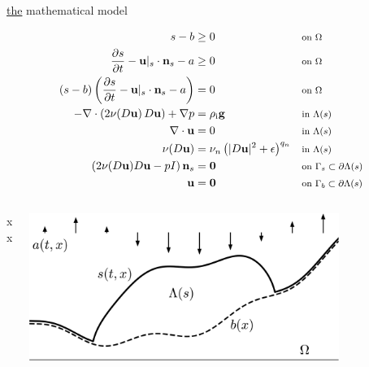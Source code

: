 \documentclass[10pt,dvipsnames]{beamer}
\newcommand{\bg}{\mathbf{g}}
\newcommand{\bn}{\mathbf{n}}
\newcommand{\bu}{\mathbf{u}}
\newcommand{\bzero}{\bm{0}}
\newcommand{\eps}{\epsilon}
\newcommand{\rhoi}{\rho_{\text{i}}}
\begin{document}
\newcommand{\where}[1]{\text{\footnotesize #1}}

\begin{frame}{\underline{the} mathematical model}

\begin{align*}
s - b &\ge 0 & &\where{on $\Omega$} \\
\frac{\partial s}{\partial t} - \bu|_s \cdot \bn_s - a &\ge 0 & &\where{on $\Omega$} \\
(s - b) \left(\frac{\partial s}{\partial t} - \bu|_s \cdot \bn_s - a\right) &= 0 & &\where{on $\Omega$} \\
- \nabla \cdot \left(2 \nu(D\bu)\, D\bu\right) + \nabla p &= \rhoi \bg && \where{in $\Lambda(s)$} \\
\nabla \cdot \bu &= 0 && \where{in $\Lambda(s)$} \\
\nu(D\bu) &= \nu_n \left(|D\bu|^2 + \eps\right)^{q_n} && \where{in $\Lambda(s)$} \\
\left(2 \nu(D\bu) D\bu - pI\right) \bn_s &= \bzero && \where{on $\Gamma_s \subset \partial\Lambda(s)$} \\
\bu  &= \bzero && \where{on $\Gamma_b \subset \partial\Lambda(s)$}
\end{align*}

\bigskip

\begin{columns}
\begin{column}{0.45\textwidth}
xx
\end{column}
\begin{column}{0.45\textwidth}
\hfill \includegraphics[width=0.8\textwidth]{stokesdomain.png}
\end{column}
\end{columns}
\end{frame}
\end{document}
